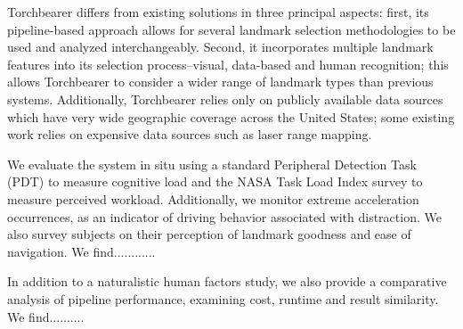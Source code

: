 Torchbearer differs from existing solutions in three principal aspects: first, its pipeline-based approach allows for several landmark selection methodologies to be used and analyzed interchangeably. Second, it incorporates multiple landmark features into its selection process--visual, data-based and human recognition; this allows Torchbearer to consider a wider range of landmark types than previous systems. Additionally, Torchbearer relies only on publicly available data sources which have very wide geographic coverage across the United States; some existing work relies on expensive data sources such as laser range mapping.

We evaluate the system in situ using a standard Peripheral Detection Task (PDT) to measure cognitive load and the NASA Task Load Index survey to measure perceived workload. Additionally, we monitor extreme acceleration occurrences, as an indicator of driving behavior associated with distraction. We also survey subjects on their perception of landmark goodness and ease of navigation. We find............

In addition to a naturalistic human factors study, we also provide a comparative analysis of pipeline performance, examining cost, runtime and result similarity. We find..........

